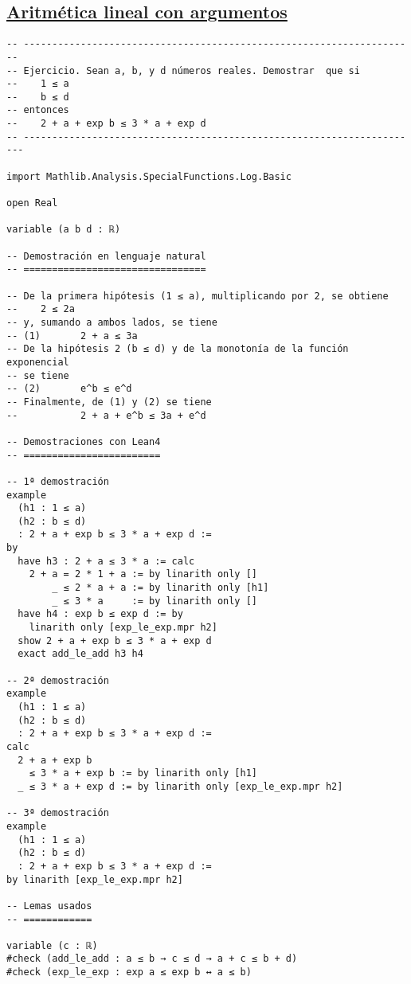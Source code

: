 \subsection{\href{./src/Basicos/Aritmetica\_lineal\_con\_argumentos.lean}{Aritmética lineal con argumentos}}
\label{sec:orgb96befd}
\begin{verbatim}
-- ---------------------------------------------------------------------
-- Ejercicio. Sean a, b, y d números reales. Demostrar  que si
--    1 ≤ a
--    b ≤ d
-- entonces
--    2 + a + exp b ≤ 3 * a + exp d
-- ----------------------------------------------------------------------

import Mathlib.Analysis.SpecialFunctions.Log.Basic

open Real

variable (a b d : ℝ)

-- Demostración en lenguaje natural
-- ================================

-- De la primera hipótesis (1 ≤ a), multiplicando por 2, se obtiene
--    2 ≤ 2a
-- y, sumando a ambos lados, se tiene
-- (1)       2 + a ≤ 3a
-- De la hipótesis 2 (b ≤ d) y de la monotonía de la función exponencial
-- se tiene
-- (2)       e^b ≤ e^d
-- Finalmente, de (1) y (2) se tiene
--           2 + a + e^b ≤ 3a + e^d

-- Demostraciones con Lean4
-- ========================

-- 1ª demostración
example
  (h1 : 1 ≤ a)
  (h2 : b ≤ d)
  : 2 + a + exp b ≤ 3 * a + exp d :=
by
  have h3 : 2 + a ≤ 3 * a := calc
    2 + a = 2 * 1 + a := by linarith only []
        _ ≤ 2 * a + a := by linarith only [h1]
        _ ≤ 3 * a     := by linarith only []
  have h4 : exp b ≤ exp d := by
    linarith only [exp_le_exp.mpr h2]
  show 2 + a + exp b ≤ 3 * a + exp d
  exact add_le_add h3 h4

-- 2ª demostración
example
  (h1 : 1 ≤ a)
  (h2 : b ≤ d)
  : 2 + a + exp b ≤ 3 * a + exp d :=
calc
  2 + a + exp b
    ≤ 3 * a + exp b := by linarith only [h1]
  _ ≤ 3 * a + exp d := by linarith only [exp_le_exp.mpr h2]

-- 3ª demostración
example
  (h1 : 1 ≤ a)
  (h2 : b ≤ d)
  : 2 + a + exp b ≤ 3 * a + exp d :=
by linarith [exp_le_exp.mpr h2]

-- Lemas usados
-- ============

variable (c : ℝ)
#check (add_le_add : a ≤ b → c ≤ d → a + c ≤ b + d)
#check (exp_le_exp : exp a ≤ exp b ↔ a ≤ b)
\end{verbatim}

